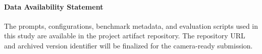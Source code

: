 \documentclass[a4paper,UKenglish,cleveref,autoref]{styles/LIPIcs/authors/lipics-v2021}%
\begin{document}
\paragraph*{Data Availability Statement}
The prompts, configurations, benchmark metadata, and evaluation scripts used in this study are available in the project artifact repository. The repository URL and archived version identifier will be finalized for the camera-ready submission.



\appendix

\end{document}
